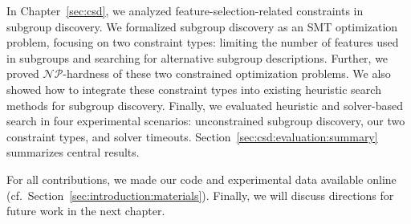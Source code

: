 In Chapter~\ref{sec:csd}, we analyzed feature-selection-related constraints in subgroup discovery.
We formalized subgroup discovery as an SMT optimization problem, focusing on two constraint types:
limiting the number of features used in subgroups and searching for alternative subgroup descriptions.
Further, we proved $\mathcal{NP}$-hardness of these two constrained optimization problems.
We also showed how to integrate these constraint types into existing heuristic search methods for subgroup discovery.
Finally, we evaluated heuristic and solver-based search in four experimental scenarios:
unconstrained subgroup discovery, our two constraint types, and solver timeouts.
Section~\ref{sec:csd:evaluation:summary} summarizes central results.

For all contributions, we made our code and experimental data available online (cf.~Section~\ref{sec:introduction:materials}).
Finally, we will discuss directions for future work in the next chapter.
